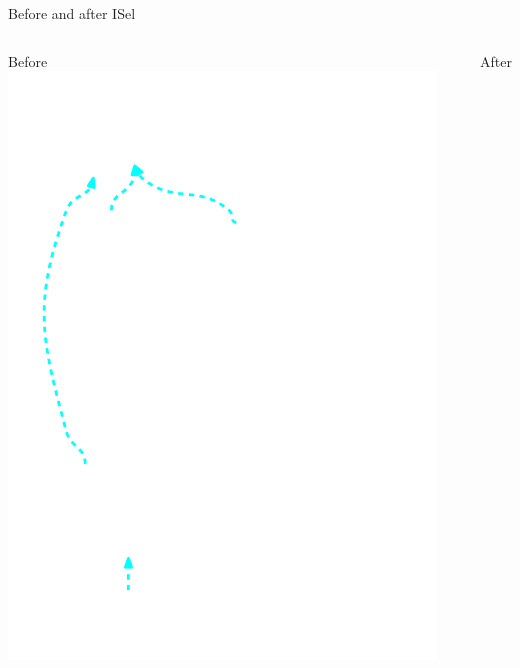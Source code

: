 
\begin{frame}{Before and after ISel}

\vspace{-4ex}
\begin{columns}[t]
    \begin{block}{Before}
        \includegraphics[width = 0.95\textwidth]{examples/ex1/ex1-entry-selection-dag.pdf}
    \end{block}
    \begin{block}{After}

\end{block}
\end{columns}
\end{frame}
